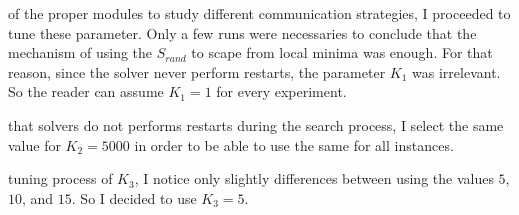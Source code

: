 of the proper modules to study different communication strategies, I proceeded to tune these parameter. Only a few runs were necessaries to conclude that the mechanism of using the \om{} $S_{rand}$ to scape from local minima was enough. For that reason, since the solver never perform restarts, the parameter $K_1$ was irrelevant. So the reader can assume $K_1 = 1$ for every experiment.

 that solvers do not performs restarts during the search process, I select the same value for $K_2 = 5000$ in order to be able to use the same \as{} for all instances.

tuning process of $K_3$, I notice only slightly differences between using the values $5$, $10$, and $15$. So I decided to use $K_3 = 5$.










































